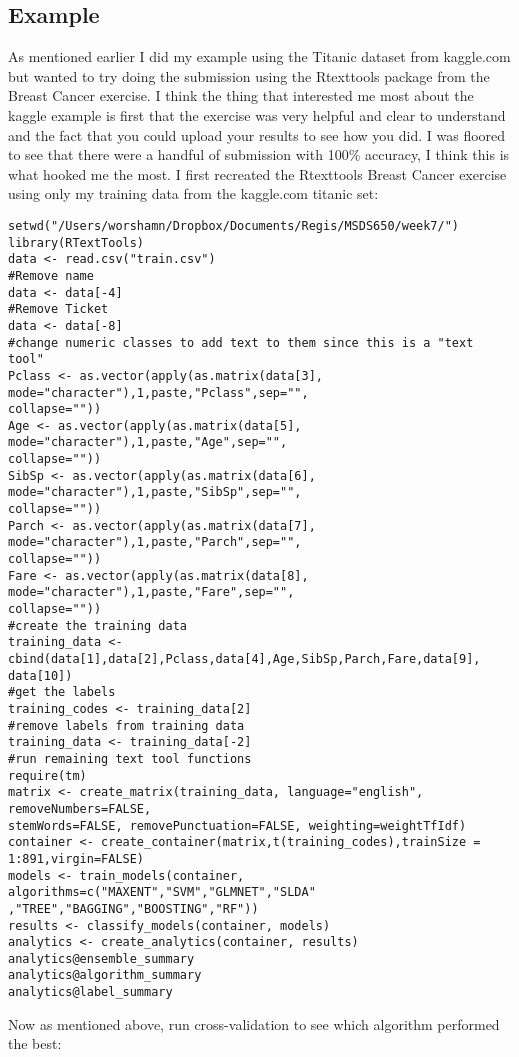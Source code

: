 \documentclass[10pt]{article}
\begin{document}
\subsection*{Example}
As mentioned earlier I did my example using the Titanic dataset from kaggle.com but wanted to try doing the submission using the Rtexttools package from the Breast Cancer exercise. I think the thing that interested me most about the kaggle example is first that the exercise was very helpful and clear to understand and the fact that you could upload your results to see how you did. I was floored to see that there were a handful of submission with 100\% accuracy, I think this is what hooked me the most. I first recreated the Rtexttools Breast Cancer exercise using only my training data from the kaggle.com titanic set:
\begin{verbatim}
setwd("/Users/worshamn/Dropbox/Documents/Regis/MSDS650/week7/")
library(RTextTools)
data <- read.csv("train.csv")
#Remove name
data <- data[-4]
#Remove Ticket
data <- data[-8]
#change numeric classes to add text to them since this is a "text tool"
Pclass <- as.vector(apply(as.matrix(data[3], mode="character"),1,paste,"Pclass",sep="",
collapse=""))
Age <- as.vector(apply(as.matrix(data[5], mode="character"),1,paste,"Age",sep="",
collapse=""))
SibSp <- as.vector(apply(as.matrix(data[6], mode="character"),1,paste,"SibSp",sep="",
collapse=""))
Parch <- as.vector(apply(as.matrix(data[7], mode="character"),1,paste,"Parch",sep="",
collapse=""))
Fare <- as.vector(apply(as.matrix(data[8], mode="character"),1,paste,"Fare",sep="",
collapse=""))
#create the training data
training_data <- cbind(data[1],data[2],Pclass,data[4],Age,SibSp,Parch,Fare,data[9],
data[10])
#get the labels
training_codes <- training_data[2]
#remove labels from training data
training_data <- training_data[-2]
#run remaining text tool functions
require(tm)
matrix <- create_matrix(training_data, language="english", removeNumbers=FALSE, 
stemWords=FALSE, removePunctuation=FALSE, weighting=weightTfIdf)
container <- create_container(matrix,t(training_codes),trainSize = 1:891,virgin=FALSE)
models <- train_models(container, algorithms=c("MAXENT","SVM","GLMNET","SLDA"
,"TREE","BAGGING","BOOSTING","RF"))
results <- classify_models(container, models)
analytics <- create_analytics(container, results)
analytics@ensemble_summary
analytics@algorithm_summary
analytics@label_summary
\end{verbatim}
Now as mentioned above, run cross-validation to see which algorithm performed the best:
\end{document}
